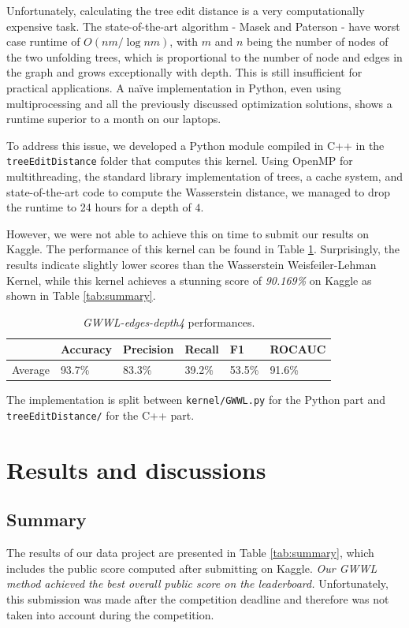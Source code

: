 \documentclass{IEEEtran}
\begin{document}
Unfortunately, calculating the tree edit distance is a very computationally expensive task.
The state-of-the-art algorithm - Masek and Paterson \cite{masek1980faster}- have worst case runtime of $O(nm/ \log nm)$,
with $m$ and $n$ being the number of nodes of the two unfolding trees,
which is proportional to the number of node and edges in the graph and grows exceptionally with depth.
This is still insufficient for practical applications.
A naïve implementation in Python,
even using multiprocessing and all the previously discussed optimization solutions, shows a runtime superior to a month on our laptops.

To address this issue, we developed a Python module compiled in C++ in the \texttt{treeEditDistance} folder that computes this kernel. Using OpenMP for multithreading, the standard library implementation of trees, a cache system, and state-of-the-art code to compute the Wasserstein distance, we managed to drop the runtime to 24 hours for a depth of $4$.

However, we were not able to achieve this on time to submit our results on Kaggle.
The performance of this kernel can be found in Table \ref{tab:gwwl}.
Surprisingly, the results indicate slightly lower scores than the Wasserstein Weisfeiler-Lehman Kernel,
while this kernel achieves a stunning score of \emph{90.169\%} on Kaggle as shown in Table \ref{tab:summary}.

\begin{table}[h]
    \centering
    \begin{tabular}{l|llll|l}
                & Accuracy & Precision & Recall & F1     & ROCAUC \\
        \hline
        Average & 93.7\%   & 83.3\%    & 39.2\% & 53.5\% & 91.6\% \\
    \end{tabular}
    \caption{\emph{GWWL-edges-depth4} performances.}
    \label{tab:gwwl}
\end{table}

The implementation is split between \texttt{kernel/GWWL.py} for the Python part and \texttt{treeEditDistance/} for the C++ part.

\section{Results and discussions}

\subsection{Summary}
The results of our data project are presented in Table \ref{tab:summary}, which includes the public score computed after submitting on Kaggle.
\emph{Our GWWL method achieved the best overall public score on the leaderboard.}
Unfortunately, this submission was made after the competition deadline
and therefore was not taken into account during the competition.
\end{document}

